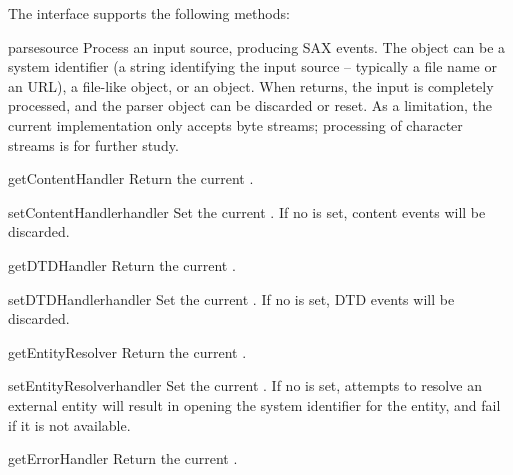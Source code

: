 The  interface supports the following methods:

\begin{methoddesc}[XMLReader]{parse}{source}
  Process an input source, producing SAX events. The 
  object can be a system identifier (a string identifying the
  input source -- typically a file name or an URL), a file-like
  object, or an  object. When 
  returns, the input is completely processed, and the parser object
  can be discarded or reset. As a limitation, the current implementation
  only accepts byte streams; processing of character streams is for
  further study.
\end{methoddesc}

\begin{methoddesc}[XMLReader]{getContentHandler}{}
  Return the current .
\end{methoddesc}

\begin{methoddesc}[XMLReader]{setContentHandler}{handler}
  Set the current .  If no
   is set, content events will be discarded.
\end{methoddesc}

\begin{methoddesc}[XMLReader]{getDTDHandler}{}
  Return the current .
\end{methoddesc}

\begin{methoddesc}[XMLReader]{setDTDHandler}{handler}
  Set the current .  If no  is
  set, DTD events will be discarded.
\end{methoddesc}

\begin{methoddesc}[XMLReader]{getEntityResolver}{}
  Return the current .
\end{methoddesc}

\begin{methoddesc}[XMLReader]{setEntityResolver}{handler}
  Set the current .  If no
   is set, attempts to resolve an external
  entity will result in opening the system identifier for the entity,
  and fail if it is not available. 
\end{methoddesc}

\begin{methoddesc}[XMLReader]{getErrorHandler}{}
  Return the current .
\end{methoddesc}

